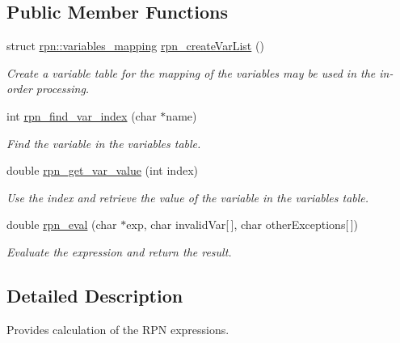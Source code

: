 \subsection*{Public Member Functions}
\begin{DoxyCompactItemize}
\item 
\hypertarget{structrpn_ae1904fb7b86d71a1770d3d156858ab59}{struct \hyperlink{structrpn_1_1variables__mapping}{rpn\-::variables\-\_\-mapping} \hyperlink{structrpn_ae1904fb7b86d71a1770d3d156858ab59}{rpn\-\_\-create\-Var\-List} ()}\label{structrpn_ae1904fb7b86d71a1770d3d156858ab59}

\begin{DoxyCompactList}\small\item\em Create a variable table for the mapping of the variables may be used in the in-\/order processing. \end{DoxyCompactList}\item 
int \hyperlink{structrpn_a866a739149e27f08393d67f1fb486b58}{rpn\-\_\-find\-\_\-var\-\_\-index} (char $\ast$name)
\begin{DoxyCompactList}\small\item\em Find the variable in the variables table. \end{DoxyCompactList}\item 
double \hyperlink{structrpn_abb8802e376ef7cbb360bdc50675b3cb5}{rpn\-\_\-get\-\_\-var\-\_\-value} (int index)
\begin{DoxyCompactList}\small\item\em Use the index and retrieve the value of the variable in the variables table. \end{DoxyCompactList}\item 
double \hyperlink{structrpn_a53f2b31140999a9a442076c23d358f1b}{rpn\-\_\-eval} (char $\ast$exp, char invalid\-Var\mbox{[}$\,$\mbox{]}, char other\-Exceptions\mbox{[}$\,$\mbox{]})
\begin{DoxyCompactList}\small\item\em Evaluate the expression and return the result. \end{DoxyCompactList}\end{DoxyCompactItemize}


\subsection{Detailed Description}
Provides calculation of the R\-P\-N expressions. 

